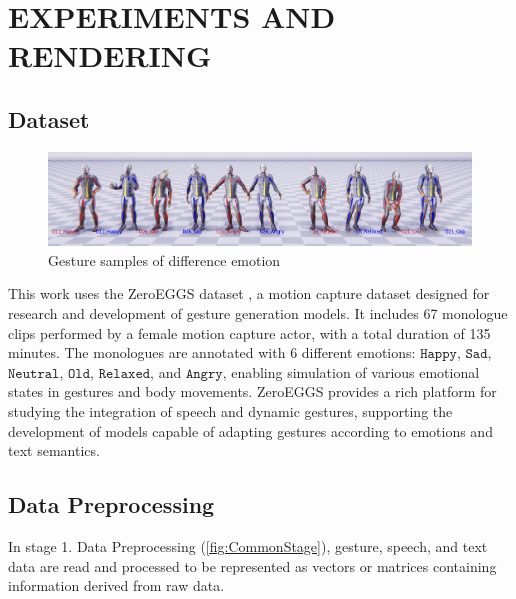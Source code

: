 
\section{EXPERIMENTS AND RENDERING}
\label{sec:results}


\subsection{Dataset}


\begin{figure}[H]
	\centering
	\includegraphics[width=\linewidth]{images/DifferenceEmotion}
	\caption{Gesture samples of difference emotion}
\end{figure}

This work uses the ZeroEGGS dataset \cite{ghorbani2022zeroeggszeroshotexamplebasedgesture}, a motion capture dataset designed for research and development of gesture generation models. It includes 67 monologue clips performed by a female motion capture actor, with a total duration of 135 minutes. The monologues are annotated with 6 different emotions: $\texttt{Happy}$, $\texttt{Sad}$, $\texttt{Neutral}$, $\texttt{Old}$, $\texttt{Relaxed}$, and $\texttt{Angry}$, enabling simulation of various emotional states in gestures and body movements. ZeroEGGS provides a rich platform for studying the integration of speech and dynamic gestures, supporting the development of models capable of adapting gestures according to emotions and text semantics.

\subsection{Data Preprocessing}
\label{sec:Preprocessing}

In stage {1. Data Preprocessing} (\autoref{fig:CommonStage}), gesture, speech, and text data are read and processed to be represented as vectors or matrices containing information derived from raw data.

